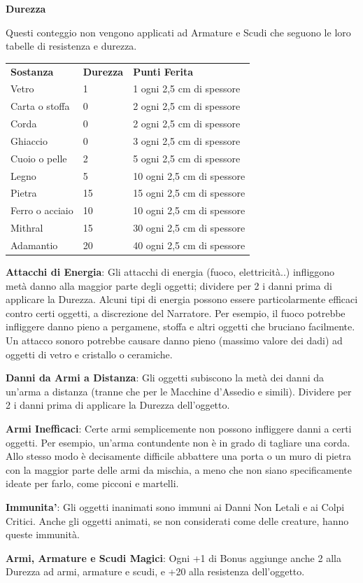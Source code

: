 \documentclass[a4paper,11pt,twoside,openany]{book}
\begin{document}
{\textbf{Durezza}

Questi conteggio non vengono applicati ad Armature e Scudi che seguono le loro tabelle di resistenza e durezza.

\bigskip

\begin{tabular}{lll}
\toprule
\textbf{Sostanza} & \textbf{Durezza} & \textbf{Punti Ferita} \tabularnewline
Vetro & 1 & 1 ogni 2,5 cm di spessore\tabularnewline
Carta o stoffa & 0 & 2 ogni 2,5 cm di spessore\tabularnewline
Corda & 0 & 2 ogni 2,5 cm di spessore\tabularnewline
Ghiaccio & 0 & 3 ogni 2,5 cm di spessore\tabularnewline
Cuoio o pelle & 2 & 5 ogni 2,5 cm di spessore\tabularnewline
Legno & 5 & 10 ogni 2,5 cm di spessore\tabularnewline
Pietra & 15 & 15 ogni 2,5 cm di spessore\tabularnewline
Ferro o acciaio & 10 & 10 ogni 2,5 cm di spessore\tabularnewline
Mithral & 15 & 30 ogni 2,5 cm di spessore\tabularnewline
Adamantio & 20 & 40 ogni 2,5 cm di spessore\tabularnewline
\end{tabular}

\bigskip

\textbf{Attacchi di Energia}: Gli attacchi di energia (fuoco, elettricità..) infliggono metà danno alla maggior parte degli oggetti; dividere per 2 i danni prima di applicare la Durezza. Alcuni tipi di energia possono essere particolarmente efficaci contro certi oggetti, a discrezione del Narratore. 
Per esempio, il fuoco potrebbe infliggere danno pieno a pergamene, stoffa e altri oggetti che bruciano facilmente. Un attacco sonoro potrebbe causare danno pieno (massimo valore dei dadi) ad oggetti di vetro e cristallo o ceramiche.

\textbf{Danni da Armi a Distanza}: Gli oggetti subiscono la metà dei danni da un'arma a distanza (tranne che per le Macchine d'Assedio e simili). Dividere per 2 i danni prima di applicare la Durezza dell'oggetto.

\textbf{Armi Inefficaci}: Certe armi semplicemente non possono infliggere danni a certi oggetti. Per esempio, un'arma contundente non è in grado di tagliare una corda.
Allo stesso modo è decisamente difficile abbattere una porta o un muro di pietra con la maggior parte delle armi da mischia, a meno che non siano specificamente ideate per farlo, come picconi e martelli.

\textbf{Immunita'}: Gli oggetti inanimati sono immuni ai Danni Non Letali e ai Colpi Critici. Anche gli oggetti animati, se non considerati come delle creature, hanno queste immunità.

\textbf{Armi, Armature e Scudi Magici}: Ogni +1 di Bonus aggiunge anche 2 alla Durezza ad armi, armature e scudi, e +20 alla resistenza dell'oggetto.

}
\end{document}
